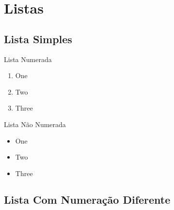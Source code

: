 
\section{Listas}
\subsection{Lista Simples}

\begin{slide}{Lista Numerada}
  \begin{enumerate}
    \item One
    \item Two
    \item Three
  \end{enumerate}
\end{slide}

\begin{slide}{Lista Não Numerada}
  \begin{itemize}
    \item One
    \item Two
    \item Three
  \end{itemize}
\end{slide}

\subsection{Lista Com Numeração Diferente}


